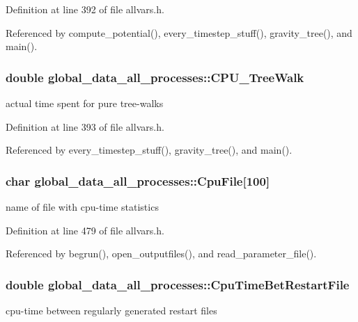 Definition at line 392 of file allvars.h.



Referenced by compute\_\-potential(), every\_\-timestep\_\-stuff(), gravity\_\-tree(), and main().

\hypertarget{structglobal__data__all__processes_acf5e983357d7be116cd6663958e5a149}{
\subsubsection[{CPU\_\-TreeWalk}]{\setlength{\rightskip}{0pt plus 5cm}double {\bf global\_\-data\_\-all\_\-processes::CPU\_\-TreeWalk}}}
\label{structglobal__data__all__processes_acf5e983357d7be116cd6663958e5a149}
actual time spent for pure tree-\/walks 

Definition at line 393 of file allvars.h.



Referenced by every\_\-timestep\_\-stuff(), gravity\_\-tree(), and main().

\hypertarget{structglobal__data__all__processes_ac2ba980c60460b89534ca8bba63cd679}{
\subsubsection[{CpuFile}]{\setlength{\rightskip}{0pt plus 5cm}char {\bf global\_\-data\_\-all\_\-processes::CpuFile}\mbox{[}100\mbox{]}}}
\label{structglobal__data__all__processes_ac2ba980c60460b89534ca8bba63cd679}
name of file with cpu-\/time statistics 

Definition at line 479 of file allvars.h.



Referenced by begrun(), open\_\-outputfiles(), and read\_\-parameter\_\-file().

\hypertarget{structglobal__data__all__processes_af087b459cc41cb6b81bdbdd0e339cb6f}{
\subsubsection[{CpuTimeBetRestartFile}]{\setlength{\rightskip}{0pt plus 5cm}double {\bf global\_\-data\_\-all\_\-processes::CpuTimeBetRestartFile}}}
\label{structglobal__data__all__processes_af087b459cc41cb6b81bdbdd0e339cb6f}
cpu-\/time between regularly generated restart files 

